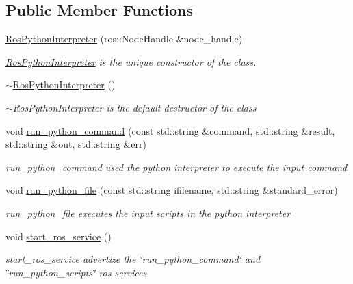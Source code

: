 \subsection*{Public Member Functions}
\begin{DoxyCompactItemize}
\item 
\hyperlink{classdynamic__graph_1_1RosPythonInterpreter_a082493a5a7edd758b65a34fc9e617df5}{Ros\+Python\+Interpreter} (ros\+::\+Node\+Handle \&node\+\_\+handle)
\begin{DoxyCompactList}\small\item\em \hyperlink{classdynamic__graph_1_1RosPythonInterpreter}{Ros\+Python\+Interpreter} is the unique constructor of the class. \end{DoxyCompactList}\item 
\hyperlink{classdynamic__graph_1_1RosPythonInterpreter_a45378e164f35c3cc8dffe1cca7473dde}{$\sim$\+Ros\+Python\+Interpreter} ()\hypertarget{classdynamic__graph_1_1RosPythonInterpreter_a45378e164f35c3cc8dffe1cca7473dde}{}\label{classdynamic__graph_1_1RosPythonInterpreter_a45378e164f35c3cc8dffe1cca7473dde}

\begin{DoxyCompactList}\small\item\em $\sim$\+Ros\+Python\+Interpreter is the default destructor of the class \end{DoxyCompactList}\item 
void \hyperlink{classdynamic__graph_1_1RosPythonInterpreter_a9745742713e7dc9302468519c1cae9a1}{run\+\_\+python\+\_\+command} (const std\+::string \&command, std\+::string \&result, std\+::string \&out, std\+::string \&err)
\begin{DoxyCompactList}\small\item\em run\+\_\+python\+\_\+command used the python interpreter to execute the input command \end{DoxyCompactList}\item 
void \hyperlink{classdynamic__graph_1_1RosPythonInterpreter_a4a90b557973b8aa533e297adab4bcbe6}{run\+\_\+python\+\_\+file} (const std\+::string ifilename, std\+::string \&standard\+\_\+error)
\begin{DoxyCompactList}\small\item\em run\+\_\+python\+\_\+file executes the input scripts in the python interpreter \end{DoxyCompactList}\item 
void \hyperlink{classdynamic__graph_1_1RosPythonInterpreter_ae6f58ecea63921945529f367c27dd70e}{start\+\_\+ros\+\_\+service} ()\hypertarget{classdynamic__graph_1_1RosPythonInterpreter_ae6f58ecea63921945529f367c27dd70e}{}\label{classdynamic__graph_1_1RosPythonInterpreter_ae6f58ecea63921945529f367c27dd70e}

\begin{DoxyCompactList}\small\item\em start\+\_\+ros\+\_\+service advertize the \char`\"{}run\+\_\+python\+\_\+command\char`\"{} and \char`\"{}run\+\_\+python\+\_\+scripts\char`\"{} ros services \end{DoxyCompactList}\end{DoxyCompactItemize}
